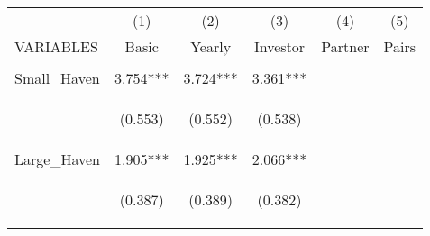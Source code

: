 \begin{center}
\begin{tabular}{lccccc} \hline
 & (1) & (2) & (3) & (4) & (5) \\
VARIABLES & Basic & Yearly & Investor & Partner & Pairs \\ \hline
\vspace{4pt} & \begin{footnotesize}\end{footnotesize} & \begin{footnotesize}\end{footnotesize} & \begin{footnotesize}\end{footnotesize} & \begin{footnotesize}\end{footnotesize} & \begin{footnotesize}\end{footnotesize} \\
Small\_Haven & 3.754*** & 3.724*** & 3.361*** &  &  \\
\vspace{4pt} & \begin{footnotesize}(0.553)\end{footnotesize} & \begin{footnotesize}(0.552)\end{footnotesize} & \begin{footnotesize}(0.538)\end{footnotesize} & \begin{footnotesize}\end{footnotesize} & \begin{footnotesize}\end{footnotesize} \\
Large\_Haven & 1.905*** & 1.925*** & 2.066*** &  &  \\
\vspace{4pt} & \begin{footnotesize}(0.387)\end{footnotesize} & \begin{footnotesize}(0.389)\end{footnotesize} & \begin{footnotesize}(0.382)\end{footnotesize} & \begin{footnotesize}\end{footnotesize} & \begin{footnotesize}\end{footnotesize} \\

\end{tabular}
\end{center}
